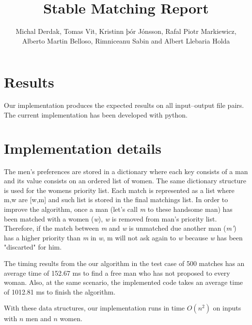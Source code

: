 \documentclass{tufte-handout}
\title{Stable Matching Report}
\author{Michal Derdak, Tomas Vit, Kristinn þór Jónsson, Rafal Piotr Markiewicz, Alberto Martin Belloso, Rimniceanu Sabin and Albert Llebaria Holda}
\begin{document}
  \maketitle

  \section{Results}

  Our implementation produces the expected results on all input--output file pairs. The current implementation has been developed with python. 
 

  \section{Implementation details}

  	The men's preferences are stored in a dictionary where each key consists of a man and its value consists on an ordered list of women.  %
	The same dictionary structure is used for the womens priority list. Each match is represented as a list where m,w are [w,m] and such list is stored in the final matchings list. In order to improve the algorithm, once a man (let's call \textit{m} to these handsome man) has been matched with a women (\textit{w}), \textit{w} is removed from man's priority list. Therefore, if the match between \textit{m} and \textit{w} is unmatched due another man (\textit{m'}) has a higher priority than \textit{m} in \textit{w}, m will not ask again to \textit{w} because \textit{w} has been "discarted" for him. 
	
	
	The timing results from the our algorithm in the test case of 500 matches has an average time of 152.67 ms to find a free man who has not proposed to every woman. Also, at the same scenario, the implemented code takes an average time of 1012.81 ms to finish the algorithm.
	
	With these data structures, our implementation runs in time $O(n^2)$ on inputs with $n$ men and $n$ women.
\end{document}
